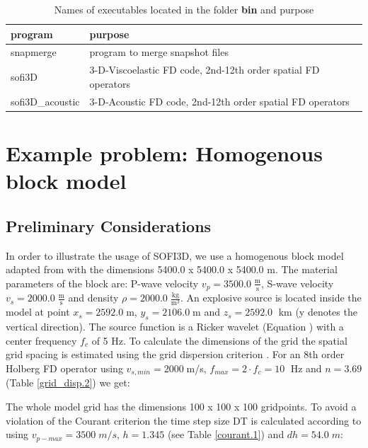 \documentclass[11pt,onecolumn,oneside]{article}
\begin{document}
\begin{table}[hbt]
\begin{tabular}{ll}
program & purpose \\ \hline
snapmerge & program to merge snapshot files \\
sofi3D & 3-D-Viscoelastic FD code, 2nd-12th order spatial FD operators\\
sofi3D\_acoustic & 3-D-Acoustic FD code, 2nd-12th order spatial FD operators\\
\end{tabular}
\caption{Names of executables located in the folder \textbf{bin} and purpose}
\label{tab_programs}
\end{table}

\cleardoublepage
\section{Example problem: Homogenous block model}\label{simple test}
\subsection{Preliminary Considerations}
In order to illustrate the usage of SOFI3D, we use a homogenous block model adapted from \cite{kang:04} with the dimensions 5400.0 x 5400.0 x 5400.0 m. The material parameters of the block are:  P-wave velocity $v_p=3500.0\; \frac{\mathrm{m}}{\mathrm{s}}$, S-wave velocity $v_s=2000.0\; \frac{\mathrm{m}}{\mathrm{s}}$ and density $\rho=2000.0\; \frac{\mathrm{kg}}{\mathrm{m}^3}$. An explosive source is located inside the model at point  $x_s=2592.0\;$m, $y_s=2106.0\;$m and $z_s=2592.0\;$ km (y denotes the vertical direction). The source function is a Ricker wavelet (Equation ) with a center frequency $f_c$ of 5 Hz. To calculate the dimensions of the grid the spatial grid spacing is estimated using the grid dispersion criterion . For an 8th order Holberg FD operator using $v_{s,min}=2000\;$m/s, $f_{max}=2 \cdot f_c=10\;$ Hz and $n=3.69$ (Table \ref{grid_disp.2}) we get:


The whole model grid has the dimensions 100 x 100 x 100 gridpoints. To avoid a violation of the Courant criterion the time step size DT is calculated according to  using $v_{p-max}=3500\; m/s$, $h=1.345$ (see Table \ref{courant.1}) and $dh=54.0\; m$:

\end{document}
